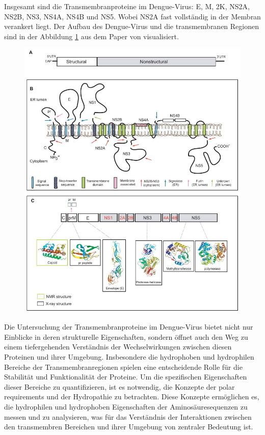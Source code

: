 \documentclass[german,version-2022-01]{uzl-thesis}
\begin{document}
Insgesamt sind die Transmembranproteine im Dengue-Virus: E, M, 2K, NS2A, NS2B, NS3, NS4A, NS4B und NS5. Wobei NS2A fast vollst\"andig in der Membran verankert liegt. Der Aufbau des Dengue-Virus und die transmembranen Regionen sind in der Abbildung \ref{fig:Dengue_virus_overview} aus dem Paper  von \citeauthor{perera_structural_2008} \cite{perera_structural_2008} visualisiert. \\
\begin{figure}[htpb]
  \centering
  \includegraphics[scale=1]{Images/Dengue_virus_overview.jpg}
  \caption{ \cite{perera_structural_2008}}
  \label{fig:Dengue_virus_overview}
\end{figure} 

Die Untersuchung der Transmembranproteine im Dengue-Virus bietet nicht nur Einblicke in deren strukturelle Eigenschaften, sondern \"offnet auch den Weg zu einem tiefergehenden Verst\"andnis der Wechselwirkungen zwischen diesen Proteinen und ihrer Umgebung. Insbesondere die hydrophoben und hydrophilen Bereiche der Transmembranregionen spielen eine entscheidende Rolle f\"ur die Stabilit\"at und Funktionalit\"at der Proteine. Um die spezifischen Eigenschaften dieser Bereiche zu quantifizieren, ist es notwendig, die Konzepte der polar requirements und der Hydropathie zu betrachten. Diese Konzepte erm\"oglichen es, die hydrophilen und hydrophoben Eigenschaften der Aminos\"auresequenzen zu messen und zu analysieren, was f\"ur das Verst\"andnis der Interaktionen zwischen den transmembren Bereichen und ihrer Umgebung von zentraler Bedeutung ist.
\end{document}
